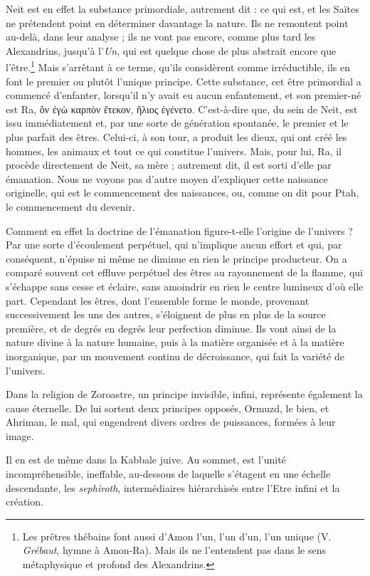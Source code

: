 \documentclass[letterpaper,twocolumn,openany,nodeprecatedcode]{dndbook}
\begin{document}
Neit est en effet la substance primordiale, autrement dit : ce qui est, et les Saïtes ne prétendent point en déterminer davantage la nature. Ils ne remontent point au-delà, dans leur analyse ; ils ne vont pas encore, comme plus tard les Alexandrins, jusqu'à l'\emph{Un}, qui est quelque chose de plus abstrait encore que l'être.\footnote{Les prêtres thébains font aussi d'Amon l'un, l'un d’un, l'un unique (V. \emph{Grébaut}, hymne à Amon-Ra). Mais ils ne l'entendent pas dans le sens métaphysique et profond des Alexandrins.} Mais s'arrêtant à ce terme, qu'ils considèrent comme irréductible, ils en font le premier ou plutôt l'unique principe. Cette substance, cet être primordial a commencé d'enfanter, lorsqu'il n'y avait eu aucun enfantement, et son premier-né est Ra, ὅν ἐγὼ καρπὸν ἔτεκον, ἥλιος ἐγένετο. C'est-à-dire que, du sein de Neit, est issu immédiatement et, par une sorte de génération spontanée, le premier et le plus parfait des êtres. Celui-ci, à son tour, a produit les dieux, qui ont créé les hommes, les animaux et tout ce qui constitue l'univers. Mais, pour lui, Ra, il procède directement de Neit, sa mère ; autrement dit, il est sorti d'elle par émanation. Nous ne voyons pas d'autre moyen d'expliquer cette naissance originelle, qui est le commencement des naissances, ou, comme on dit pour Ptah, le commencement du devenir.

Comment en effet la doctrine de l'émanation figure-t-elle l'origine de l'univers ? Par une sorte d'écoulement perpétuel, qui n'implique aucun effort et qui, par conséquent, n'épuise ni même ne diminue en rien le principe producteur. On a comparé souvent cet effluve perpétuel des êtres au rayonnement de la flamme, qui s'échappe sans cesse et éclaire, sans amoindrir en rien le centre lumineux d'où elle part. Cependant les êtres, dont l'ensemble forme le monde, provenant successivement les uns des autres, s'éloignent de plus en plus de la source première, et de degrés en degrés leur perfection diminue. Ils vont ainsi de la nature divine à la nature humaine, puis à la matière organisée et à la matière inorganique, par un mouvement continu de décroissance, qui fait la variété de l'univers.

Dans la religion de Zoroastre, un principe invisible, infini, représente également la cause éternelle. De lui sortent deux principes opposés, Ormuzd, le bien, et Ahriman, le mal, qui engendrent divers ordres de puissances, formées à leur image.

Il en est de même dans la Kabbale juive. Au sommet, est l'unité incompréhensible, ineffable, au-dessous de laquelle s'étagent en une échelle descendante, les \emph{sephiroth}, intermédiaires hiérarchisés entre l'Etre infini et la création.
\end{document}
